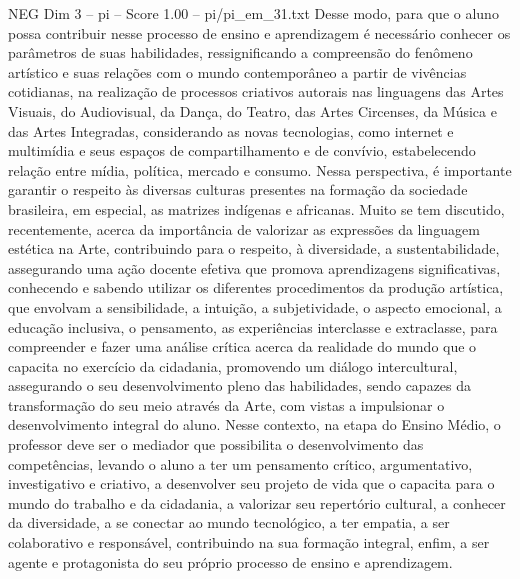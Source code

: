 \begin{textsample}{NEG Dim 3 – pi – Score 1.00 – pi/pi\_em\_31.txt}
Desse modo, para que o aluno possa contribuir nesse processo de ensino e aprendizagem é necessário conhecer os parâmetros de suas habilidades, ressignificando a compreensão do fenômeno artístico e suas relações com o mundo contemporâneo a partir de vivências cotidianas, na realização de processos criativos autorais nas linguagens das Artes Visuais, do Audiovisual, da Dança, do Teatro, das Artes Circenses, da Música e das Artes Integradas, considerando as novas tecnologias, como internet e multimídia e seus espaços de compartilhamento e de convívio, estabelecendo relação entre mídia, política, mercado e consumo.
Nessa perspectiva, é importante garantir o respeito às diversas culturas presentes na formação da sociedade brasileira, em especial, as matrizes indígenas e africanas.
Muito se tem discutido, recentemente, acerca da importância de valorizar as expressões da linguagem estética na Arte, contribuindo para o respeito, à diversidade, a sustentabilidade, assegurando uma ação docente efetiva que promova aprendizagens significativas, conhecendo e sabendo utilizar os diferentes procedimentos da produção artística, que envolvam a sensibilidade, a intuição, a subjetividade, o aspecto emocional, a educação inclusiva, o pensamento, as experiências interclasse e extraclasse, para compreender e fazer uma análise crítica acerca da realidade do mundo que o capacita no exercício da cidadania, promovendo um diálogo intercultural, assegurando o seu desenvolvimento pleno das habilidades, sendo capazes da transformação do seu meio através da Arte, com vistas a impulsionar o desenvolvimento integral do aluno.
Nesse contexto, na etapa do Ensino Médio, o professor deve ser o mediador que possibilita o desenvolvimento das competências, levando o aluno a ter um pensamento crítico, argumentativo, investigativo e criativo, a desenvolver seu projeto de vida que o capacita para o mundo do trabalho e da cidadania, a valorizar seu repertório cultural, a conhecer da diversidade, a se conectar ao mundo tecnológico, a ter empatia, a ser colaborativo e responsável, contribuindo na sua formação integral, enfim, a ser agente e protagonista do seu próprio processo de ensino e aprendizagem.

\end{textsample}
